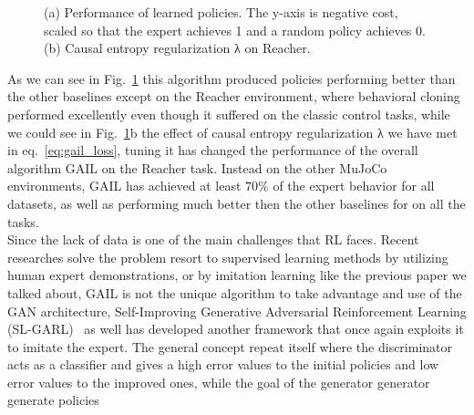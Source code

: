 \begin{figure}
	\centerline
	\GAILExperiments
	\caption{(a) Performance of learned policies. The y-axis is negative cost, scaled so that the expert achieves 1 and a random policy achieves 0. (b) Causal entropy regularization λ on Reacher.}
	\label{fig:GAILExperiments}
\end{figure}
As we can see in Fig.~\ref{fig:GAILExperiments} this algorithm produced policies performing better than the other baselines except on the Reacher environment, where behavioral cloning performed excellently even though it suffered on the classic control tasks, while we could see in Fig.~\ref{fig:GAILExperiments}b the effect of causal entropy regularization λ we have met in eq.~\ref{eq:gail_loss}, tuning it has changed the performance of the overall algorithm GAIL on the Reacher task. Instead on the other MuJoCo environments, GAIL has achieved at least $70\%$ of the expert behavior for all datasets, as well as performing much better then the other baselines for on all the tasks.\\
Since the lack of data is one of the main challenges that RL faces. Recent researches solve the problem resort to supervised learning methods by utilizing human expert demonstrations, or by imitation learning like the previous paper we talked about,
GAIL is not the unique algorithm to take advantage and use of the GAN architecture, Self-Improving Generative Adversarial Reinforcement Learning (SL-GARL)~\cite{liu2019self} as well has developed another framework that once again exploits it to imitate the expert. The general concept repeat itself where the discriminator acts as a classifier and gives a high error values to the initial policies and low error values to the improved ones, while the goal of the generator
 generator generate policies
\clearpage{\pagestyle{empty}\cleardoublepage}